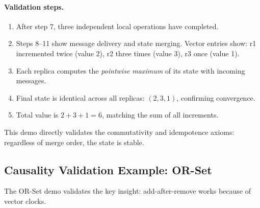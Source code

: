 \paragraph{Validation steps.}
\begin{enumerate}
  \item After step 7, three independent local operations have completed.
  \item Steps 8--11 show message delivery and state merging. Vector entries show: r1 incremented twice (value 2), r2 three times (value 3), r3 once (value 1).
  \item Each replica computes the \emph{pointwise maximum} of its state with incoming messages.
  \item Final state is identical across all replicas: $(2, 3, 1)$, confirming convergence.
  \item Total value is $2 + 3 + 1 = 6$, matching the sum of all increments.
\end{enumerate}

This demo directly validates the commutativity and idempotence axioms: regardless of merge order, the state is stable.

\subsection{Causality Validation Example: OR-Set}

The OR-Set demo validates the key insight: add-after-remove works because of vector clocks.

